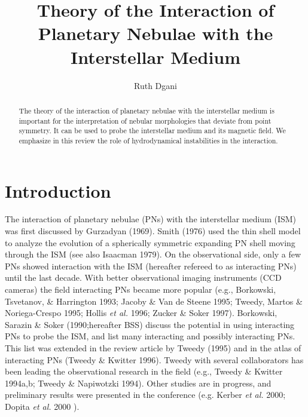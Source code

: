 \documentclass{article}
\begin{document}
\title{Theory of the Interaction of Planetary Nebulae with the Interstellar Medium}
 \author{Ruth Dgani}

\begin{abstract}
The theory of the interaction of planetary nebulae with the interstellar 
medium is important for the interpretation of nebular morphologies that 
deviate from point symmetry. It can be used to probe the interstellar 
medium and its magnetic field. We emphasize in this review the role of
hydrodynamical instabilities in the interaction. 
\end{abstract}

\section{Introduction}
The interaction of planetary nebulae (PNs) with the interstellar medium (ISM)
was first discussed by Gurzadyan (1969). Smith (1976) used the thin shell model
to analyze the evolution of a spherically symmetric expanding PN shell
moving through the ISM (see also Isaacman 1979). 
On the observational side, only a few PNs showed interaction with the ISM 
(hereafter refereed to as interacting PNs) until the last decade.
With better observational imaging instruments (CCD cameras) the field
interacting PNs became more popular 
(e.g., Borkowski, Tsvetanov, \& Harrington 1993; Jacoby \& Van de Steene 1995;
Tweedy, Martos \& Noriega-Crespo 1995; Hollis {\it et al.} 1996;
Zucker \& Soker 1997). Borkowski, Sarazin \& Soker (1990;hereafter  BSS) discuss
the potential in using interacting PNs to probe the ISM, and list many 
interacting and possibly interacting PNs.
This list was extended in the review article by Tweedy (1995)
and in the atlas of interacting PNs (Tweedy \& Kwitter 1996). Tweedy 
with several collaborators has been leading the observational research
in the field (e.g., Tweedy \& Kwitter 1994a,b; Tweedy \& Napiwotzki 1994).
Other studies are in progress, and preliminary 
results were presented in the conference (e.g. Kerber {\it et al.} 2000;
Dopita {\it et al.} 2000 ).
\end{document}
